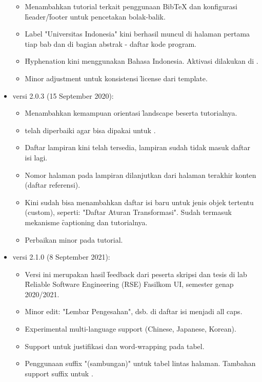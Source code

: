 \begin{itemize}
\begin{itemize}
			\item Menambahkan tutorial terkait penggunaan BibTeX dan konfigurasi \f{header}/\f{footer} untuk pencetakan bolak-balik.
			\item Label "Universitas Indonesia" kini berhasil muncul di halaman pertama tiap bab dan di bagian abstrak - daftar kode program.
			\item \f{Hyphenation} kini menggunakan  Bahasa Indonesia. Aktivasi dilakukan di .
			\item Minor adjustment untuk konsistensi \f{license} dari template.
		\end{itemize}
	\item versi 2.0.3 (15 September 2020):
		\begin{itemize}
			\item Menambahkan kemampuan orientasi \f{landscape} beserta tutorialnya.
			\item {} telah diperbaiki agar bisa dipakai untuk .
			\item Daftar lampiran kini telah tersedia, lampiran sudah tidak masuk daftar isi lagi.
			\item Nomor halaman pada lampiran dilanjutkan dari halaman terakhir konten (daftar referensi).
			\item Kini sudah bisa menambahkan daftar isi baru untuk jenis objek tertentu (custom), seperti: "Daftar Aturan Transformasi". Sudah termasuk mekanisme \f{captioning} dan tutorialnya.
			\item Perbaikan minor pada tutorial.
		\end{itemize}
	\item versi 2.1.0 (8 September 2021):
		\begin{itemize}
			\item Versi ini merupakan hasil \f{feedback} dari peserta skripsi dan tesis di lab \f{Reliable Software Engineering} (RSE) Fasilkom UI, semester genap 2020/2021.
			\item Minor edit: "Lembar Pengesahan", dsb. di daftar isi menjadi all caps.
			\item Experimental multi-language support (Chinese, Japanese, Korean).
			\item Support untuk justifikasi dan word-wrapping pada tabel.
			\item Penggunaan suffix "(sambungan)" untuk tabel lintas halaman. Tambahan support suffix untuk .
		\end{itemize}
\end{itemize}

